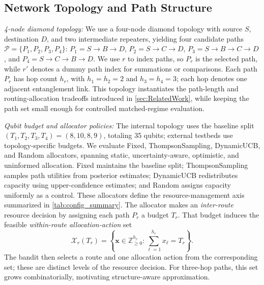 \documentclass[10pt,journal]{IEEEtran}
\newcommand{\smallTitle}[1]{\vspace{1mm}\noindent\textit{#1:}}
\newcommand{\devroop}[1]{\textcolor{magenta}{\textit{[Devroop: #1]}}}
\newcommand{\shee}[1]{\textcolor{purple}{\textit{[Shee: #1]}}}
\begin{document}
\subsection{Network Topology and Path Structure}
\label{subsec:topology}

\smallTitle{4-node diamond topology}
We use a four-node diamond topology with source $S$, destination $D$, and two intermediate repeaters, yielding four candidate paths $\mathcal{P}=\{P_1,P_2,P_3,P_4\}$: $P_1=S{\to}B{\to}D$, $P_2=S{\to}C{\to}D$, $P_3=S{\to}B{\to}C{\to}D$, and $P_4=S{\to}C{\to}B{\to}D$. We use $r$ to index paths, so $P_r$ is the selected path, while $r'$ denotes a dummy path index for summations or comparisons. Each path $P_r$ has hop count $h_r$, with $h_1=h_2=2$ and $h_3=h_4=3$; each hop denotes one adjacent entanglement link. This topology instantiates the path-length and routing-allocation tradeoffs introduced in \cref{sec:RelatedWork}, while keeping the path set small enough for controlled matched-regime evaluation.

\smallTitle{Qubit budget and allocator policies}
The internal topology uses the baseline split $(T_1,T_2,T_3,T_4)=(8,10,8,9)$, totaling 35 qubits; external testbeds use topology-specific budgets. We evaluate Fixed, ThompsonSampling, DynamicUCB, and Random allocators, spanning static, uncertainty-aware, optimistic, and uninformed allocation. Fixed maintains the baseline split; ThompsonSampling samples path utilities from posterior estimates; DynamicUCB redistributes capacity using upper-confidence estimates; and Random assigns capacity uniformly as a control. These allocators define the resource-management axis summarized in \cref{tab:config_summary}. The allocator makes an \emph{inter-route} resource decision by assigning each path $P_r$ a budget $T_r$. That budget induces the feasible \emph{within-route allocation-action} set
\[
\mathcal{X}_r(T_r)=\left\{\mathbf{x}\in\mathbb{Z}_{\geq0}^{h_r}:\sum_{\ell=1}^{h_r}x_\ell=T_r\right\}.
\]
The bandit then selects a route and one allocation action from the corresponding set; these are distinct levels of the resource decision. For three-hop paths, this set grows combinatorially, motivating structure-aware approximation.
\end{document}
